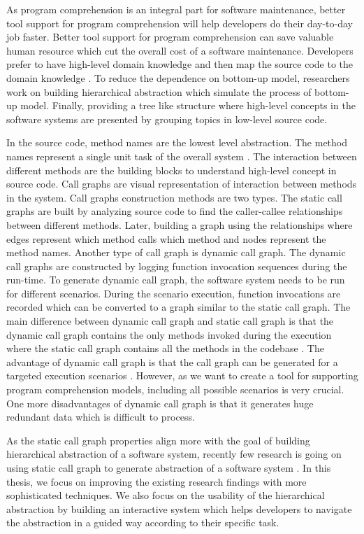  As program comprehension is an integral part for software maintenance, better tool support for program comprehension will help developers do their day-to-day job faster. Better tool support for program comprehension can save valuable human resource which cut the overall cost of a software maintenance. Developers prefer to have high-level domain knowledge and then map the source code to the domain knowledge \cite{brooks1983theoryComprehensionPrograms}. To reduce the dependence on bottom-up model, researchers work on building hierarchical abstraction which simulate the process of bottom-up model. Finally, providing a tree like structure where high-level concepts in the software systems are presented by grouping topics in low-level source code. 


In the source code, method names are the lowest level abstraction. The method names represent a single unit task of the overall system \cite{de2012using, starke2009searching}. The interaction between different methods are the building blocks to understand high-level concept in source code. Call graphs are visual representation of interaction between methods in the system. Call graphs construction methods are two types. The static call graphs are built by analyzing source code to find the caller-callee relationships between different methods. Later, building a graph using the relationships where edges represent which method calls which method and nodes represent the method names. Another type of call graph is dynamic call graph. The dynamic call graphs are constructed by logging function invocation sequences during the run-time. To generate dynamic call graph, the software system needs to be run for different scenarios. During the scenario execution, function invocations are recorded which can be converted to a graph similar to the static call graph. The main difference between dynamic call graph and static call graph is that the dynamic call graph contains the only methods invoked during the execution where the static call graph contains all the methods in the codebase \cite{gharibi2018automaticStaticCluster}. The advantage of dynamic call graph is that the call graph can be generated for a targeted execution scenarios \cite{feng2018hierarchicalExecutionComprehension}. However, as we want to create a tool for supporting program comprehension models, including all possible scenarios is very crucial. One more disadvantages of dynamic call graph is that it generates huge redundant data which is difficult to process. 

As the static call graph properties align more with the goal of building hierarchical abstraction of a software system, recently few research is going on using static call graph to generate abstraction of a software system \cite{gharibi2018automaticStaticCluster, walunj2019graphevoEvolutionCall}. In this thesis, we focus on improving the existing research findings with more sophisticated techniques. We also focus on the usability of the hierarchical abstraction by building an interactive system which helps developers to navigate the abstraction in a guided way according to their specific task. 

